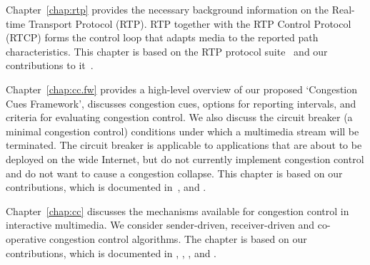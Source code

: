 
Chapter~\ref{chap:rtp} provides the necessary background information on the 
Real-time Transport Protocol (RTP). RTP together with the RTP Control Protocol (RTCP)
forms the control loop that adapts media to the reported path characteristics.
This chapter is based on the RTP protocol suite~\cite{rfc3550, rfc4585,
rfc3611, rfc5104, rfc5506} and our contributions to
it~\cite{rfc7097, rfc7005, rfc7243, draft.xr.post.repair}.


Chapter~\ref{chap:cc.fw} provides a high-level overview of our proposed
`Congestion Cues Framework', discusses congestion cues, options for reporting
intervals, and criteria for evaluating congestion control. We also discuss the
circuit breaker (a minimal congestion control) conditions under which a
multimedia stream will be terminated. The circuit breaker is applicable to
applications that are about to be deployed on the wide Internet, but do not
currently implement congestion control and do not want to cause a congestion
collapse. This chapter is based on our contributions, which is documented
in~\cite{Singh:control.loops.api, draft.rmcat.app.interaction,
draft.rmcat.evaluate, Singh:PhDFw, draft.rtp.cb, Sarker:CB.lte}, and .



Chapter~\ref{chap:cc} discusses the mechanisms available for congestion
control in interactive multimedia. We consider sender-driven, receiver-driven
and co-operative congestion control algorithms. The chapter is based on our
contributions, which is documented in \cite{singh:2010.thesis},
, , and .


